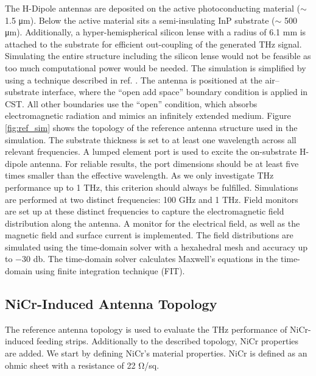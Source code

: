
The H-Dipole antennas are deposited on the active photoconducting material ($\sim$ \num{1.5} \si{\micro\meter}). Below the active material sits a semi-insulating InP substrate ($\sim$ \num{500} \si{\micro\meter}). Additionally, a hyper-hemispherical silicon lense with a radius of \num{6.1} \si{\milli\meter} is attached to the substrate for efficient out-coupling of the generated THz signal. Simulating the entire structure including the silicon lense would not be feasible as too much computational power would be needed. The simulation is simplified by using a technique described in  ref. \cite{llombartTHzTimeDomainSensing2012,garufoNortonEquivalentCircuit2018}. The antenna is positioned at the air–substrate interface, where the \enquote{open add space} boundary condition is applied in CST. All other boundaries use the \enquote{open} condition, which absorbs electromagnetic radiation and mimics an infinitely extended medium. Figure \ref{fig:ref_sim} shows the topology of the reference antenna structure used in the simulation. The substrate thickness is set to at least one wavelength across all relevant frequencies. A lumped element port is used to excite the on-substrate H-dipole antenna. For reliable results, the port dimensions should be at least five times smaller than the effective wavelength. As we only investigate THz performance up to \num{1} \si{\tera\hertz}, this criterion should always be fulfilled. Simulations are performed at two distinct frequencies: \num{100} \si{\giga \hertz} and \num{1} \si{\tera\hertz}. Field monitors are set up at these distinct frequencies to capture the electromagnetic field distribution along the antenna. A monitor for the electrical field, as well as the magnetic field and surface current is implemented. 
The field distributions are simulated using the time-domain solver with a hexahedral mesh and accuracy up to \num{-30} \si{\decibel}. The time-domain solver calculates Maxwell's equations in the time-domain using finite integration technique (FIT).

\subsection{NiCr-Induced Antenna Topology}
The reference antenna topology is used to evaluate the THz performance of NiCr-induced feeding strips. Additionally to the described topology, NiCr properties are added. We start by defining NiCr's material properties. NiCr is defined as an ohmic sheet with a resistance of \num{22} \si{\ohm/sq}. 

